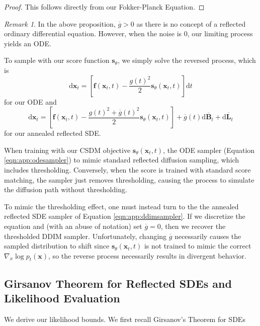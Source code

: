 \documentclass{article}
\theoremstyle{plain}
\theoremstyle{definition}
\theoremstyle{remark}
\newtheorem{remark}[theorem]{Remark}
\newcommand{\sqbrac}[1]{\left[#1\right]}
\newcommand{\grad}{\nabla}
\renewcommand{\vec}{\mathbf}
\newcommand{\dd}{\mathrm{d}}
\begin{document}
\begin{proof}
    This follows directly from our Fokker-Planck Equation.
\end{proof}
\begin{remark}
    In the above proposition, $\overline{g} > 0$ as there is no concept of a reflected ordinary differential equation. However, when the noise is $0$, our limiting process yields an ODE.
\end{remark}
To sample with our score function $\vec{s}_\theta$, we simply solve the reversed process, which is
\begin{equation}\label{eqn:app:odesampler}
    \dd \vec{x}_t = \sqbrac{\vec{f}(\vec{x}_t, t) - \frac{g(t)^2}{2} \vec{s}_\theta(\vec{x}_t, t)} \dd t
\end{equation}
for our ODE and
\begin{equation}\label{eqn:app:ddimsampler}
    \dd\vec{x}_t = \sqbrac{\vec{f}(\vec{x}_t, t) - \frac{g(t)^2 + \overline{g}(t)^2}{2} \vec{s}_\theta(\vec{x}_t, t)} + \overline{g}(t) \dd \overline{\vec{B}}_t + \dd \overline{\vec{L}}_t
\end{equation}
for our annealed reflected SDE.

When training with our CSDM objective $\vec{s}_\theta(\vec{x}_t, t)$, the ODE sampler (Equation \ref{eqn:app:odesampler}) to mimic standard reflected diffusion sampling, which includes thresholding. Conversely, when the score is trained with standard score matching, the sampler just removes thresholding, causing the process to simulate the diffusion path without thresholding.

To mimic the thresholding effect, one must instead turn to the the annealed reflected SDE sampler of Equation \ref{eqn:app:ddimsampler}. If we discretize the equation and (with an abuse of notation) set $\overline{g} = 0$, then we recover the thresholded DDIM sampler. Unfortunately, changing $\overline{g}$ necessarily causes the sampled distribution to shift since $\vec{s}_\theta(\vec{x}_t, t)$ is not trained to mimic the correct $\grad_x \log p_t(\vec{x})$, so the reverse process necessarily results in divergent behavior.

\subsection{Girsanov Theorem for Reflected SDEs and Likelihood Evaluation}\label{sec:app:theory:girs}

We derive our likelihood bounds. We first recall Girsanov's Theorem for SDEs \citep{ksendal1987StochasticDE}
\end{document}
